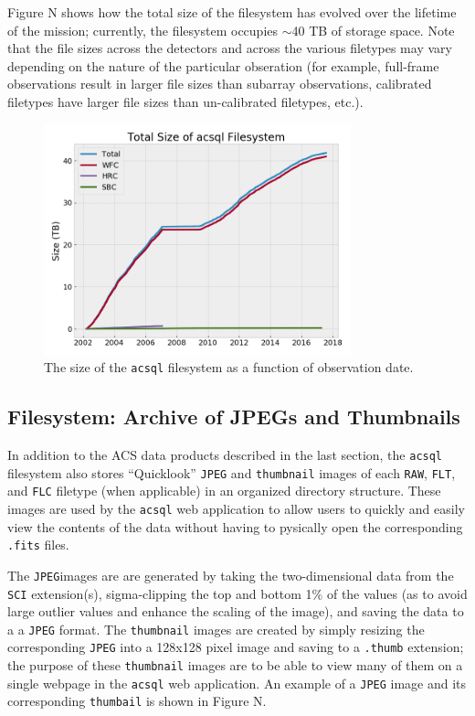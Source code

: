 \documentclass[10pt,journal,compsoc]{IEEEtran}
\begin{document}
Figure N shows how the total size of the filesystem has evolved over the lifetime of the
mission; currently, the filesystem occupies $\sim${40} TB of storage space.  Note that the
file sizes across the detectors and across the various filetypes may vary depending on the
nature of the particular obseration (for example, full-frame observations result in larger
file sizes than subarray observations, calibrated filetypes have larger file sizes than
un-calibrated filetypes, etc.).

\begin{figure}[!t]
\centering
\includegraphics[width=3.5in]{./figures/filesystem_size.png}
\caption{The size of the \texttt{acsql} filesystem as a function of observation
date.}
\label{fig1}
\end{figure}


\subsection{Filesystem: Archive of JPEGs and Thumbnails}

In addition to the ACS data products described in the last section, the
\texttt{acsql} filesystem also stores ``Quicklook'' \texttt{JPEG} and
\texttt{thumbnail} images of each \texttt{RAW}, \texttt{FLT}, and \texttt{FLC}
filetype (when applicable) in an organized directory structure.  These
images are used by the \texttt{acsql} web application to allow users to
quickly and easily view the contents of the data without having to
pysically open the corresponding \texttt{.fits} files.

The \texttt{JPEG}images are are generated by taking the two-dimensional
data from the \texttt{SCI} extension(s), sigma-clipping the top and bottom
1\% of the values (as to avoid large outlier values and enhance the scaling
of the image), and saving the data to a a \texttt{JPEG} format.  The
\texttt{thumbnail} images are created by simply resizing the corresponding
\texttt{JPEG} into a 128x128 pixel image and saving to a \texttt{.thumb}
extension; the purpose of these \texttt{thumbnail} images are to be able
to view many of them on a single webpage in the \texttt{acsql} web
application.  An example of a \texttt{JPEG} image and its corresponding
\texttt{thumbail} is shown in Figure N.
\end{document}
